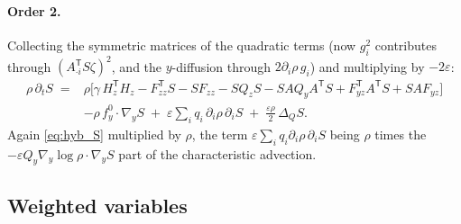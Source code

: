 \documentclass[11pt,a4paper]{article}
\newcommand{\T}{^{\mathsf T}}
\newcommand{\eps}{\varepsilon}
\newcommand{\gy}{\nabla_{\!y}}
\theoremstyle{plain}
\theoremstyle{definition}
\theoremstyle{remark}
\begin{document}
\paragraph{Order 2.}
Collecting the symmetric matrices of the quadratic terms (now $g_i^2$ contributes through $(A_{\cdot i}\T S\zeta)^2$, and the $y$-diffusion through $2\partial_i\rho\,g_i$) and multiplying by $-2\eps$:
\begin{equation}
\begin{aligned}
  \rho\,\partial_tS \;={}& \rho\Big[\gamma\,H_z\T H_z - F_{zz}\T S - SF_{zz} - SQ_zS - SAQ_yA\T S + F_{yz}\T A\T S + SAF_{yz}\Big] \\
  &- \rho\,f_y^0\cdot\gy S \;+\; \eps\sum_i q_i\,\partial_i\rho\,\partial_iS \;+\; \frac{\eps\rho}{2}\,\Delta_QS .
\end{aligned}
\label{eq:p_order2}
\end{equation}
Again \eqref{eq:hyb_S} multiplied by $\rho$, the term $\eps\sum_iq_i\partial_i\rho\,\partial_iS$ being $\rho$ times the $-\eps Q_y\gy\log\rho\cdot\gy S$ part of the characteristic advection.

\subsection{Weighted variables}
\end{document}
